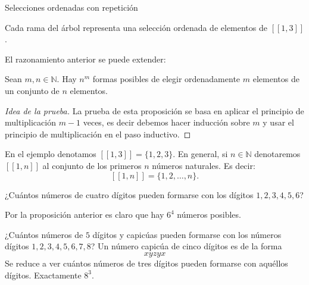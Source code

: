\begin{section}{Selecciones ordenadas con repetición}
\begin{ejemplo}



Cada rama del árbol representa una selección ordenada de elementos de $[[1, 3]]$.

\end{ejemplo}

El razonamiento anterior  se puede extender:

\begin{proposicion}
Sean  $m,n \in \mathbb N$. Hay   $n^m$ formas posibles de elegir ordenadamente $m$ elementos de un conjunto de $n$ elementos.
\end{proposicion}
\begin{proof}[Idea de la prueba]
La prueba de esta proposición se basa en aplicar el principio de multiplicación $m-1$ veces, es decir debemos hacer inducción sobre $m$ y usar el principio de multiplicación en el paso inductivo. 
\end{proof}

\begin{observacion} En el ejemplo denotamos $ [[ 1 , 3]] = \{ 1, 2, 3 \}$. En general, si  $n \in \mathbb N$ denotaremos  $[[ 1 , n]]$ al conjunto de los primeros $n$ números naturales. Es decir:
$$
 [[ 1 , n]] = \{ 1, 2, \ldots,n\}.
$$  
\end{observacion}

\begin{ejemplo}
¿Cuántos números de cuatro dígitos pueden formarse con
los dígitos $1, 2, 3, 4, 5, 6$?

Por la proposición anterior es claro que hay $6^4$ números posibles.
\end{ejemplo}


\begin{ejemplo}
¿Cuántos números de $5$ dígitos y capicúas pueden formarse
con los números dígitos $1, 2, 3, 4, 5, 6, 7, 8$? Un número
capicúa de cinco dígitos es de la forma
$$xyzyx$$
Se reduce a ver cuántos números de tres dígitos pueden
formarse con aquéllos dígitos.
Exactamente $8^3$.
\end{ejemplo}




\end{section}
